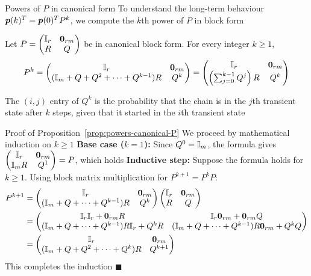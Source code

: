 \documentclass[aspectratio=169]{beamer}\usepackage[]{graphicx}\usepackage[]{xcolor}
\begin{document}
\begin{frame}{Powers of $P$ in canonical form}
To understand the long-term behaviour $\bm{p}(k)^T = \bm{p}(0)^T P^k$, we compute the $k$th power of $P$ in block form
\vfill
\begin{proposition}
\label{prop:powers-canonical-P}
Let $P = \begin{pmatrix} \II_r & \b0_{rm} \\ R & Q \end{pmatrix}$ be in canonical block form. For every integer $k \ge 1$,
\[
P^k = \begin{pmatrix}
\II_r & \b0_{rm} \\
(\II_m + Q + Q^2 + \cdots + Q^{k-1})R & Q^k
\end{pmatrix} = \begin{pmatrix}
\II_r & \b0_{rm} \\
\left(\sum_{j=0}^{k-1} Q^j\right) R & Q^k
\end{pmatrix}
\]
\end{proposition}
\vfill
The $(i,j)$ entry of $Q^k$ is the probability that the chain is in the $j$th transient state after $k$ steps, given that it started in the $i$th transient state
\end{frame}

\begin{frame}{Proof of Proposition~\ref{prop:powers-canonical-P}}
We proceed by mathematical induction on $k \ge 1$
\vfill
\textbf{Base case ($k=1$):} Since $Q^0 = \mathbb{I}_m$, the formula gives $\begin{pmatrix} \II_r & \b0_{rm} \\ \II_m R & Q^1 \end{pmatrix} = P$, which holds
\vfill
\textbf{Inductive step:} Suppose the formula holds for $k \ge 1$. Using block matrix multiplication for $P^{k+1} = P^k P$:
\begin{align*}
P^{k+1} &= \begin{pmatrix}
\II_r & \b0_{rm} \\
(\II_m + Q + \cdots + Q^{k-1})R & Q^k
\end{pmatrix}
\begin{pmatrix}
\II_r & \b0_{rm} \\
R & Q
\end{pmatrix} \\
&= \begin{pmatrix}
\II_r \II_r + \b0_{rm} R & \II_r \b0_{rm} + \b0_{rm} Q \\
(\II_m + Q + \cdots + Q^{k-1})R\II_r + Q^k R & (\II_m + Q + \cdots + Q^{k-1})R\b0_{rm} + Q^k Q
\end{pmatrix} \\
&= \begin{pmatrix}
\II_r & \b0_{rm} \\
(\II_m + Q + Q^2 + \cdots + Q^k)R & Q^{k+1}
\end{pmatrix}
\end{align*}
This completes the induction \hfill $\blacksquare$
\end{frame}
\end{document}
